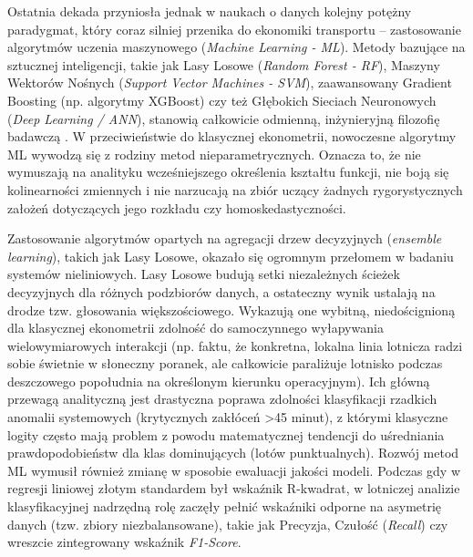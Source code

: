Ostatnia dekada przyniosła jednak w naukach o danych kolejny potężny paradygmat, który coraz silniej przenika do ekonomiki transportu – zastosowanie algorytmów uczenia maszynowego (\textit{Machine Learning - ML}). Metody bazujące na sztucznej inteligencji, takie jak Lasy Losowe (\textit{Random Forest - RF}), Maszyny Wektorów Nośnych (\textit{Support Vector Machines - SVM}), zaawansowany Gradient Boosting (np. algorytmy XGBoost) czy też Głębokich Sieciach Neuronowych (\textit{Deep Learning / ANN}), stanowią całkowicie odmienną, inżynieryjną filozofię badawczą \cite{albassam2025}. W przeciwieństwie do klasycznej ekonometrii, nowoczesne algorytmy ML wywodzą się z rodziny metod nieparametrycznych. Oznacza to, że nie wymuszają na analityku wcześniejszego określenia kształtu funkcji, nie boją się kolinearności zmiennych i nie narzucają na zbiór uczący żadnych rygorystycznych założeń dotyczących jego rozkładu czy homoskedastyczności. 

Zastosowanie algorytmów opartych na agregacji drzew decyzyjnych (\textit{ensemble learning}), takich jak Lasy Losowe, okazało się ogromnym przełomem w badaniu systemów nieliniowych. Lasy Losowe budują setki niezależnych ścieżek decyzyjnych dla różnych podzbiorów danych, a ostateczny wynik ustalają na drodze tzw. głosowania większościowego. Wykazują one wybitną, niedoścignioną dla klasycznej ekonometrii zdolność do samoczynnego wyłapywania wielowymiarowych interakcji (np. faktu, że konkretna, lokalna linia lotnicza radzi sobie świetnie w słoneczny poranek, ale całkowicie paraliżuje lotnisko podczas deszczowego popołudnia na określonym kierunku operacyjnym). Ich główną przewagą analityczną jest drastyczna poprawa zdolności klasyfikacji rzadkich anomalii systemowych (krytycznych zakłóceń >45 minut), z którymi klasyczne logity często mają problem z powodu matematycznej tendencji do uśredniania prawdopodobieństw dla klas dominujących (lotów punktualnych). Rozwój metod ML wymusił również zmianę w sposobie ewaluacji jakości modeli. Podczas gdy w regresji liniowej złotym standardem był wskaźnik R-kwadrat, w lotniczej analizie klasyfikacyjnej nadrzędną rolę zaczęły pełnić wskaźniki odporne na asymetrię danych (tzw. zbiory niezbalansowane), takie jak Precyzja, Czułość (\textit{Recall}) czy wreszcie zintegrowany wskaźnik \textit{F1-Score}.

